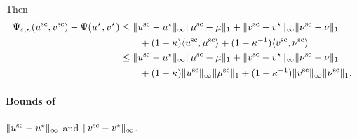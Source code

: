 Then
\begin{align}
\Psi_{\varepsilon, \kappa}(u^{\text{sc}} ,v^{\text{sc}}) -\Psi(u^\star, v^\star) &
\leq \|{u}^{\text{sc}} - {u}^\star\|_\infty \|\mu^{\text{sc}} - \mu\|_1 + \|{v}^{\text{sc}} - {v}^\star\|_\infty \|\nu^{\text{sc}} - \nu\|_1\nonumber\\
&\qquad + (1- \kappa)\langle {u}^{\text{sc}} ,{\mu}^{\text{sc}} \rangle + (1- \kappa^{-1})\langle {v}^{\text{sc}} ,{\nu}^{\text{sc}} \rangle\nonumber\\
&\leq \|{u}^{\text{sc}} - {u}^\star\|_\infty \|\mu^{\text{sc}} - \mu\|_1 + \|{v}^{\text{sc}} - {v}^\star\|_\infty\|\nu^{\text{sc}} - \nu\|_1 \nonumber\\
&\qquad + (1- \kappa)\|{u}^{\text{sc}}\|_\infty\|{\mu}^{\text{sc}}\|_1 + (1- \kappa^{-1})\|{v}^{\text{sc}}\|_\infty\|{\nu}^{\text{sc}}\|_1.\label{priori_bounds_induction}
\end{align}

\paragraph{Bounds of}$\|{u}^{\textrm{sc}} - {u}^\star\|_\infty $ and $\|{v}^{\text{sc}} - {v}^\star\|_\infty $.

